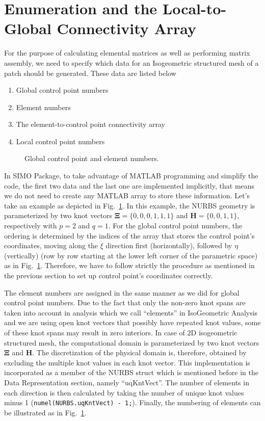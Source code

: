 \section{Enumeration and the Local-to-Global Connectivity Array}
For the purpose of calculating elemental matrices as well as performing matrix assembly, we need to specify which data for an Isogeometric structured mesh of a patch should be generated. These data are listed below
\begin{enumerate}
    \item Global control point numbers
    \item Element numbers
    \item The element-to-control point connectivity array
    \item Local control point numbers
\end{enumerate}
\begin{figure}[H]
    \centering
    \normalsize
    
    \caption{Global control point and element numbers.}
    \label{fig:Ch3SurfAQuarterOfACylinderEnum}
\end{figure}
In SIMO Package, to take advantage of MATLAB programming and simplify the code, the first two data and the last one are implemented implicitly, that means we do not need to create any MATLAB array to store these information. Let's take an example as depicted in Fig.~\ref{fig:Ch3SurfAQuarterOfACylinderEnum}. In this example, the NURBS geometry is parameterized by two knot vectors $\boldsymbol{\Xi} = \{0, 0, 0, 1, 1, 1\}$ and $\mathbf{H} = \{0, 0, 1, 1 \}$, respectively with $p = 2$ and $q = 1$. For the global control point numbers, the ordering is determined by the indices of the array that stores the control point's coordinates, moving along the $\xi$ direction first (horizontally), followed by $\eta$ (vertically) (row by row starting at the lower left corner of the parametric space) as in Fig.~\ref{fig:Ch3SurfAQuarterOfACylinderEnum}. Therefore, we have to follow strictly the procedure as mentioned in the previous section to set up control point's coordinates correctly.

The element numbers are assigned in the same manner as we did for global control point numbers. Due to the fact that only the non-zero knot spans are taken into account in analysis which we call ``elements'' in IsoGeometric Analysis and we are using open knot vectors that possibly have repeated knot values, some of these knot spans may result in zero interiors. In case of 2D isogeometric structured mesh, the computational domain is parameterized by two knot vectors $\boldsymbol{\Xi}$ and $\mathbf{H}$. The discretization of the physical domain is, therefore, obtained by excluding the multiple knot values in each knot vector. This implementation is incorporated as a member of the NURBS struct which is mentioned before in the Data Representation section, namely ``uqKntVect''. The number of elements in each direction is then calculated by taking the number of unique knot values minus 1 (\lstinline{numel(NURBS.uqKntVect) - 1;}). Finally, the numbering of elements can be illustrated as in Fig.~\ref{fig:Ch3SurfAQuarterOfACylinderEnum}.

